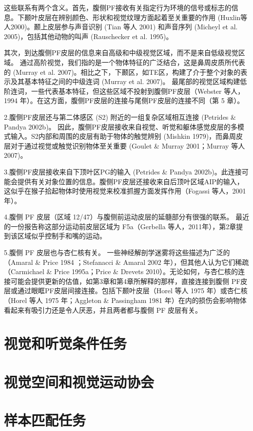 这些联系有两个含义。首先，腹侧PF接收有关指定行为环境的信号或标志的信息。下颞叶皮层在辨别颜色、形状和视觉纹理方面起着至关重要的作用 (Huxlin等人2000)。颞上皮层参与声音识别 (Tian 等人 2001) 和声音序列 (Micheyl et al. 2005)，包括其他动物的叫声 (Rauschecker et al. 1995)。 
\par
其次，到达腹侧PF皮层的信息来自高级和中级视觉区域，而不是来自低级视觉区域。 通过高阶视觉，我们指的是一个物体特征的广泛结合，这是鼻周皮质所代表的 (Murray et al. 2007)。相比之下，下颞区，如TE区，构建了介于整个对象的表示及其基本特征之间的中级连词 (Murray et al. 2007)。 最尾部的视觉区域构建低阶连词，一些代表基本特征，但这些区域不投射到腹侧PF皮层（Webster 等人，1994 年）。在这方面，腹侧PF皮层的连接与尾侧PF皮层的连接不同（第 5 章）。
\par
2.腹侧PF皮层还与第二体感区 (S2) 附近的一组复杂区域相互连接 (Petrides \& Pandya 2002b)。 因此，腹侧PF皮层接收来自视觉、听觉和躯体感觉皮层的多模式输入。S2内部和周围的皮层有助于物体的触觉辨别 (Mishkin 1979)，而鼻周皮层对于通过视觉或触觉识别物体至关重要 (Goulet \& Murray 2001；Murray 等人 2007)。
\par
3.腹侧PF皮层接收来自下顶叶区PG的输入 (Petrides \& Pandya 2002b)。此连接可能会提供有关对象位置的信息。腹侧PF皮层还接收来自后顶叶区域AIP的输入，这似乎在猴子拾起物体时使用视觉来校准抓握方面发挥作用（Fogassi 等人，2001 年）。
\par
4.腹侧 PF 皮层（区域 12/47）与腹侧前运动皮层的延髓部分有很强的联系。 最近的一份报告称这部分运动前皮层区域为 F5a（Gerbella 等人，2011年），第2章提到该区域似乎控制手和嘴的运动。 
\par
5.腹侧 PF 皮层也与杏仁核有关。 一些神经解剖学迷雾将这些描述为广泛的（Amaral \& Price 1984 ；Stefanacci \& Amaral 2002 年），但其他人认为它们稀疏（Carmichael \& Price 1995a；Price \& Drevets 2010）。无论如何，与杏仁核的连接可能会提供更新的估值，如第3章和第4章所解释的那样，直接连接到腹侧 PF皮层或通过眼眶PF皮层间接连接。包括下颞叶皮层（Horel 等人 1975 年）或杏仁核（Horel 等人 1975 年；Aggleton \& Passingham 1981 年）在内的损伤会影响物体看起来有吸引力还是令人厌恶，并且两者都与腹侧 PF 皮层有关。
\section{视觉和听觉条件任务}

\section{视觉空间和视觉运动协会}

\section{样本匹配任务}

